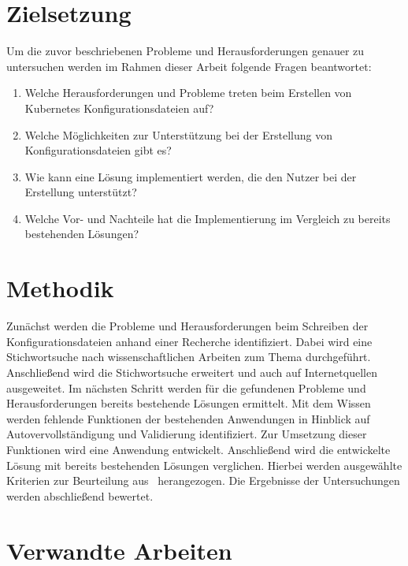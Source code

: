 \section{Zielsetzung}
Um die zuvor beschriebenen Probleme und Herausforderungen genauer zu untersuchen werden im Rahmen dieser Arbeit folgende Fragen beantwortet:
\begin{enumerate}
      \item Welche Herausforderungen und Probleme treten beim Erstellen von Kubernetes Konfigurationsdateien auf?
      \item Welche Möglichkeiten zur Unterstützung bei der Erstellung von Konfigurationsdateien gibt es?
      \item Wie kann eine Lösung implementiert werden, die den Nutzer bei der Erstellung unterstützt?
      \item Welche Vor- und Nachteile hat die Implementierung im Vergleich zu bereits bestehenden Lösungen?
\end{enumerate}


\section{Methodik}
Zunächst werden die Probleme und Herausforderungen beim Schreiben der Konfigurationsdateien anhand einer Recherche identifiziert.
Dabei wird eine Stichwortsuche nach wissenschaftlichen Arbeiten zum Thema durchgeführt. Anschließend wird die Stichwortsuche
erweitert und auch auf Internetquellen ausgeweitet.
Im nächsten Schritt werden für die gefundenen Probleme und Herausforderungen bereits bestehende Lösungen ermittelt.
Mit dem Wissen werden fehlende Funktionen der bestehenden Anwendungen in Hinblick auf Autovervollständigung und Validierung identifiziert.
Zur Umsetzung dieser Funktionen wird eine Anwendung entwickelt.
Anschließend wird die entwickelte Lösung mit bereits bestehenden Lösungen verglichen.
Hierbei werden ausgewählte Kriterien zur Beurteilung aus~\cite[A Large-Scale Study of Usability Criteria Addressed by Static Analysis Tools]{usability-criteria-static-analysis-tools} herangezogen.
Die Ergebnisse der Untersuchungen werden abschließend bewertet.

\section{Verwandte Arbeiten}\label{sec:introduction-related-work}

